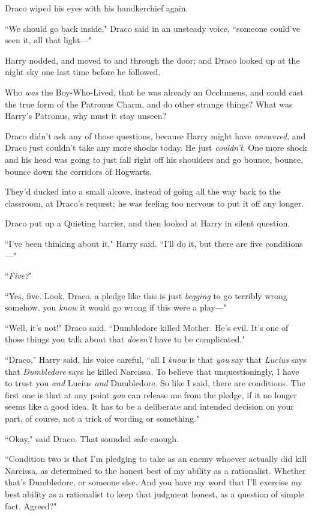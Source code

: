 Draco wiped his eyes with his handkerchief again.

``We should go back inside," Draco said in an unsteady voice, ``someone could've seen it, all that light—"

Harry nodded, and moved to and through the door; and Draco looked up at the night sky one last time before he followed.

Who \emph{was} the Boy-Who-Lived, that he was already an Occlumens, and could cast the true form of the Patronus Charm, and do other strange things? What was Harry's Patronus, why must it stay unseen?

Draco didn't ask any of those questions, because Harry might have \emph{answered}, and Draco just couldn't take any more shocks today. He just \emph{couldn't}. One more shock and his head was going to just fall right off his shoulders and go bounce, bounce, bounce down the corridors of Hogwarts.

\later

They'd ducked into a small alcove, instead of going all the way back to the classroom, at Draco's request; he was feeling too nervous to put it off any longer.

Draco put up a Quieting barrier, and then looked at Harry in silent question.

``I've been thinking about it," Harry said. ``I'll do it, but there are five conditions—"

``\emph{Five?}"

``Yes, five. Look, Draco, a pledge like this is just \emph{begging} to go terribly wrong somehow, you \emph{know} it would go wrong if this were a play—"

``Well, it's not!" Draco said. ``Dumbledore killed Mother. He's evil. It's one of those things you talk about that \emph{doesn't} have to be complicated."

``Draco," Harry said, his voice careful, ``all I \emph{know} is that \emph{you} say that \emph{Lucius} says that \emph{Dumbledore} says he killed Narcissa. To believe that unquestioningly, I have to trust you \emph{and} Lucius \emph{and} Dumbledore. So like I said, there are conditions. The first one is that at any point \emph{you} can release me from the pledge, if it no longer seems like a good idea. It has to be a deliberate and intended decision on your part, of course, not a trick of wording or something."

``Okay," said Draco. That sounded safe enough.

``Condition two is that I'm pledging to take as an enemy whoever actually did kill Narcissa, as determined to the honest best of my ability as a rationalist. Whether that's Dumbledore, or someone else. And you have my word that I'll exercise my best ability as a rationalist to keep that judgment honest, as a question of simple fact. Agreed?"

